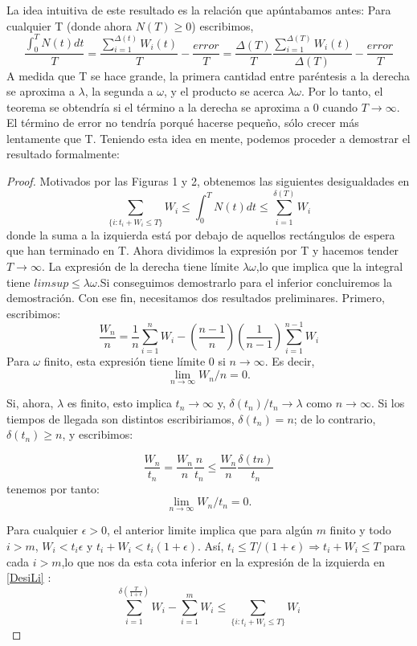 \documentclass[a4paper,10pt]{scrartcl}
\theoremstyle{definition}
\numberwithin{equation}{section}
\begin{document}
La idea intuitiva de este resultado es la relación que apúntabamos antes: Para cualquier T (donde ahora $N (T) \geq 0$) escribimos,
\[ \frac{\int_{0}^{T} N(t)dt}{T}=\frac{\sum_{i=1}^{\Delta (t)} W_i(t)}{T}-\frac{error}{T}=\frac{\Delta(T)}{T}\frac{\sum_{i=1}^{\Delta (T)} W_i(t)}{\Delta(T)}-\frac{error}{T}   \]
A medida que T se hace grande, la primera cantidad entre paréntesis a la derecha se aproxima a $\lambda$, la segunda a $\omega$, y el producto se acerca $\lambda\omega$. Por lo tanto, el teorema se obtendría si el término a la derecha se aproxima a 0 cuando $T\rightarrow\infty$. El término de error no tendría porqué hacerse pequeño, sólo crecer más lentamente que T.
Teniendo esta idea en mente, podemos proceder a demostrar el resultado formalmente:
\begin{proof}
Motivados por las Figuras 1 y 2, obtenemos las siguientes desigualdades en
\begin{equation}
 \sum_{\{i:t_i+W_i\leq T\}}^{} W_i\leq\int_{0}^{T}N(t)dt\leq \sum_{i=1}^{\delta(T)} W_i
 \label{DesiLi}
 \end{equation}
donde la suma a la izquierda está por debajo de aquellos rectángulos de espera que han terminado en T.
Ahora dividimos la expresión por T y hacemos tender $T\rightarrow\infty$. La expresión de la derecha tiene límite $\lambda\omega$,lo que implica que la integral tiene $lim sup \leq \lambda\omega$.Si conseguimos demostrarlo para el inferior concluiremos la demostración. Con ese fin, necesitamos dos resultados preliminares. Primero, escribimos:
\[ \frac{W_n}{n}=\frac{1}{n}\sum_{i=1}^{n}W_i-(\frac{n-1}{n})(\frac{1}{n-1})\sum_{i=1}^{n-1}W_i \]
Para $\omega$ finito, esta expresión tiene límite 0 si $n \rightarrow \infty$. Es decir,
\[ \lim_{n\to\infty} W_n / n = 0. \]

Si, ahora, $\lambda$ es finito, esto implica $t_n \rightarrow \infty$ y, $\delta(t_n)/t_n \rightarrow  \lambda$ como $n \rightarrow \infty$. Si los tiempos de llegada son distintos escribiriamos, $\delta(t_n)=n$; de lo contrario, $\delta(t_n)\geq n$, y escribimos:

\[ \frac{W_n }{t_n} = \frac{W_n }{n}\frac{n }{t_n}\leq \frac{W_n }{n}\frac{\delta(tn)}{t_n} \]
 tenemos por tanto:
 \[ \lim_{n\to\infty} W_n / t_n = 0. \]

Para cualquier $\epsilon> 0$, el anterior limite implica que para algún $m$ finito y todo $i> m$, $W_i <t_i\epsilon$ y $t_i + W_i <t_i (1 + \epsilon)$. Así, $t_i \leq T / (1 + \epsilon) \Longrightarrow t_i + W_i \leq T$ para cada $i> m$,lo que nos da esta cota inferior en la expresión de la izquierda en \ref{DesiLi} :
\begin{equation}\sum_{i=1}^{\delta(\frac{T}{1+\epsilon})} W_i-\sum_{i=1}^{m} W_i\leq \sum_{\{i:t_i+W_i\leq T\}}^{} W_i
\label{DesiLi2}
\end{equation}


\end{proof}
\end{document}
